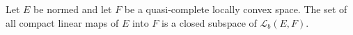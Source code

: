 Let $E$ be normed and let $F$ be a quasi-complete locally convex space. The set of all compact linear maps of $E$ into $F$ is a closed subspace of $\mathcal{L}_b(E, F)$.
